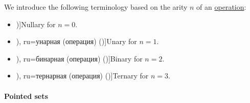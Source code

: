 \begin{definition}\label{def:operation_arity_terminology}
  We introduce the following terminology based on the arity \( n \) of an \hyperref[def:operation_on_set]{operation}:
  \begin{itemize}
    \item \term[ru=нульарная (операция) (\cite[108]{Курош1973ОбщаяАлгебра})]{Nullary} for \( n = 0 \).
    \item \term[bg=унарна (операция) (\cite[75]{ГеновМиховскиМоллов1991Алгебра}), ru=унарная (операция) (\cite[def. 1.4]{Эдельман1975Логика})]{Unary} for \( n = 1 \).
    \item \term[bg=бинарна (операция) (\cite[def. IV.1]{ГеновМиховскиМоллов1991Алгебра}), ru=бинарная (операция) (\cite[def. 1.4]{Эдельман1975Логика})]{Binary} for \( n = 2 \).
    \item \term[bg=тернарна (операция) (\cite[75]{ГеновМиховскиМоллов1991Алгебра}), ru=тернарная (операция) (\cite[def. 1.4]{Эдельман1975Логика})]{Ternary} for \( n = 3 \).
  \end{itemize}
\end{definition}

\paragraph{Pointed sets}

